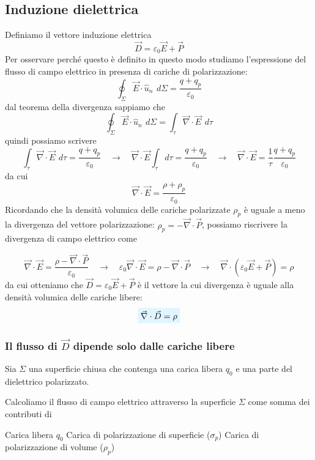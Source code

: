 \documentclass[x11names]{report}
\newcommand{\viola}[1]{%
	\colorbox{myblue}{$\displaystyle #1$}
}
\begin{document}
\subsection{Induzione dielettrica}
Definiamo il vettore induzione elettrica
\[
\vec{D} = \varepsilon_0\vec{E} + \vec{P	}
\]
Per osservare perché questo è definito in questo modo studiamo l'espressione del flusso di campo elettrico in presenza di cariche di polarizzazione:
\[
\oint_{\Sigma} \vec{E} \cdot \hat{u}_n \,\ d\Sigma = \frac{q + q_p}{\varepsilon_0}
\]
dal teorema della divergenza sappiamo che 
\[
\oint_{\Sigma}\vec{E} \cdot \hat{u}_n \,\ d\Sigma = \int_{\tau} \vec{\nabla}\cdot \vec{E} \,\ d\tau
\]
quindi possiamo scrivere
\[
\int_{\tau} \vec{\nabla}\cdot \vec{E} \,\ d\tau = \frac{q + q_p}{\varepsilon_0} \quad \to \quad \vec{\nabla}\cdot \vec{E} \int_{\tau}  d\tau = \frac{q + q_p}{\varepsilon_0} \quad \to \quad \vec{\nabla}\cdot \vec{E} = \frac{1}{\tau}  \frac{q + q_p}{\varepsilon_0}
\]
da cui
\[
\vec{\nabla}\cdot \vec{E} = \frac{\rho + \rho_p}{\varepsilon_0}
\]
Ricordando che la densità volumica delle cariche polarizzate \(\rho_p\) è uguale a meno la divergenza del vettore polarizzazione: \(\rho_p = - \vec{\nabla}\cdot \vec{P}\), possiamo riscrivere la divergenza di campo elettrico come

\[
\vec{\nabla}\cdot \vec{E} = \frac{\rho - \vec{\nabla}\cdot \vec{P}}{\varepsilon_0}  \quad \to \quad \varepsilon_0\vec{\nabla}\cdot \vec{E} = \rho - \vec{\nabla}\cdot \vec{P} \quad \to \quad \vec{\nabla} \cdot \left(\varepsilon_0\vec{E} + \vec{P}\right) = \rho
\]
da cui otteniamo che \(\vec{D} = \varepsilon_0\vec{E} + \vec{P}\) è il vettore la cui divergenza è uguale alla densità volumica delle cariche libere:
\begin{equation}
	\viola{\vec{\nabla} \cdot \vec{D}= \rho} 
\end{equation}

\subsubsection{Il flusso di \(\vec{D}\) dipende solo dalle cariche libere}
Sia \(\Sigma\) una superficie chiusa che contenga una carica libera \(q_0\) e una parte del dielettrico polarizzato. 

Calcoliamo il flusso di campo elettrico attraverso la superficie \(\Sigma\) come somma dei contributi di
\begin{center}
	 Carica libera \(q_0\) \hspace{0.2cm} Carica di polarizzazione di superficie (\(\sigma_p\)) \hspace{0.2cm} Carica di polarizzazione di volume (\(\rho_p\))
\end{center}
\end{document}
